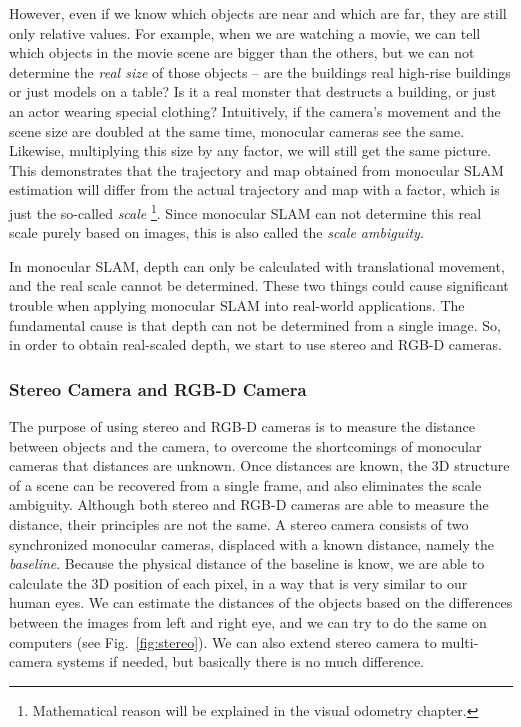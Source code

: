 However, even if we know which objects are near and which are far, they are still only relative values. For example, when we are watching a movie, we can tell which objects in the movie scene are bigger than the others, but we can not determine the \emph{real size} of those objects -- are the buildings real high-rise buildings or just models on a table? Is it a real monster that destructs a building, or just an actor wearing special clothing? Intuitively, if the camera's movement and the scene size are doubled at the same time, monocular cameras see the same. Likewise, multiplying this size by any factor, we will still get the same picture. This demonstrates that the trajectory and map obtained from monocular SLAM estimation will differ from the actual trajectory and map with a factor, which is just the so-called \emph{scale} \footnote{Mathematical reason will be explained in the visual odometry chapter.}. Since monocular SLAM can not determine this real scale purely based on images, this is also called the \emph{scale ambiguity}.

In monocular SLAM, depth can only be calculated with translational movement, and the real scale cannot be determined. These two things could cause significant trouble when applying monocular SLAM into real-world applications. The fundamental cause is that depth can not be determined from a single image. So, in order to obtain real-scaled depth, we start to use stereo and RGB-D cameras.

\subsubsection{Stereo Camera and RGB-D Camera}
The purpose of using stereo and RGB-D cameras is to measure the distance between objects and the camera, to overcome the shortcomings of monocular cameras that distances are unknown. Once distances are known, the 3D structure of a scene can be recovered from a single frame, and also eliminates the scale ambiguity. Although both stereo and RGB-D cameras are able to measure the distance, their principles are not the same. A stereo camera consists of two synchronized monocular cameras, displaced with a known distance, namely the \emph{baseline}. Because the physical distance of the baseline is know, we are able to calculate the 3D position of each pixel, in a way that is very similar to our human eyes. We can estimate the distances of the objects based on the differences between the images from left and right eye, and we can try to do the same on computers (see Fig.~\ref{fig:stereo}). We can also extend stereo camera to multi-camera systems if needed, but basically there is no much difference.

